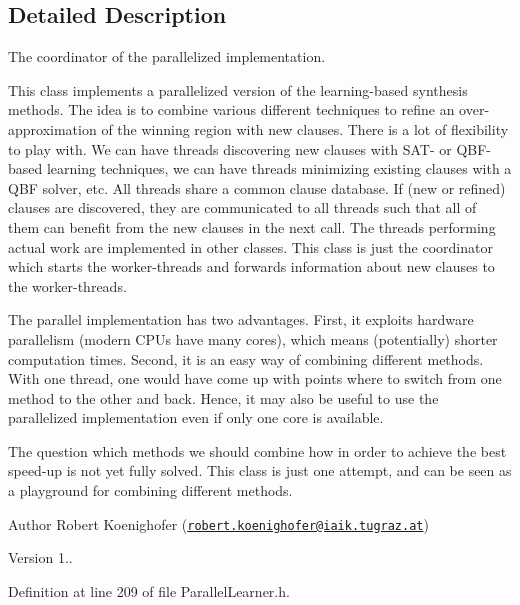 \subsection{Detailed Description}
The coordinator of the parallelized implementation. 

This class implements a parallelized version of the learning-\/based synthesis methods. The idea is to combine various different techniques to refine an over-\/approximation of the winning region with new clauses. There is a lot of flexibility to play with. We can have threads discovering new clauses with S\-A\-T-\/ or Q\-B\-F-\/based learning techniques, we can have threads minimizing existing clauses with a Q\-B\-F solver, etc. All threads share a common clause database. If (new or refined) clauses are discovered, they are communicated to all threads such that all of them can benefit from the new clauses in the next call. The threads performing actual work are implemented in other classes. This class is just the coordinator which starts the worker-\/threads and forwards information about new clauses to the worker-\/threads.

The parallel implementation has two advantages. First, it exploits hardware parallelism (modern C\-P\-Us have many cores), which means (potentially) shorter computation times. Second, it is an easy way of combining different methods. With one thread, one would have come up with points where to switch from one method to the other and back. Hence, it may also be useful to use the parallelized implementation even if only one core is available.

The question which methods we should combine how in order to achieve the best speed-\/up is not yet fully solved. This class is just one attempt, and can be seen as a playground for combining different methods.

\begin{DoxyAuthor}{Author}
Robert Koenighofer (\href{mailto:robert.koenighofer@iaik.tugraz.at}{\tt robert.\-koenighofer@iaik.\-tugraz.\-at}) 
\end{DoxyAuthor}
\begin{DoxyVersion}{Version}
1.. 
\end{DoxyVersion}


Definition at line 209 of file Parallel\-Learner.\-h.



